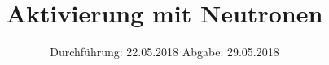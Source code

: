 
\usepackage{longtable}
\usepackage{wrapfig}
\usepackage{ dsfont }
\subject{VERSUCH 702}
\title{Aktivierung mit Neutronen}
\date{%
  \hspace{-2.5em}
  Durchführung: 22.05.2018
  \hspace{4em}
  Abgabe: 29.05.2018
}


  \setlength{\parindent}{0em}
  \maketitle
  \thispagestyle{empty}
  \newpage
  \tableofcontents
  \newpage





\printbibliography{}



